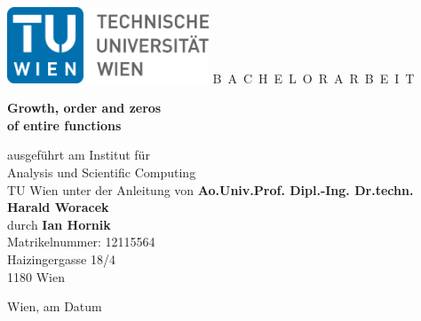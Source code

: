 \documentclass[a4paper,11pt,bibliography=totoc,listof=totoc,headinclude=true,cleardoublepage=empty,oneside]{scrbook}
\newcommand{\1}{\mathbbm{1}}
\theoremstyle{plain}
\theoremstyle{definition}
\begin{document}


\begin{titlepage}
  \begin{center}
    \includegraphics[width=0.45\textwidth]{TULogo.eps}
    \vskip 1cm%
    {\LARGE B~\Large A~C~H~E~L~O~R~A~R~B~E~I~T}
    \vskip 8mm
    {\huge\bfseries{} Growth, order and zeros \\ of entire functions \par}
    \vskip 1cm
    \large 
    ausgef\"uhrt am    
    \vskip 0.75cm
    {\Large Institut f\"ur\\[1ex] Analysis und Scientific Computing}\\[1ex]
    {\Large TU Wien}
    \vskip0.75cm
    unter der Anleitung von
    \vskip0.75cm
    {\Large\bfseries Ao.Univ.Prof. Dipl.-Ing. Dr.techn. Harald Woracek}\\[1ex]
    \vskip 0.5cm
    durch
    \vskip 0.5cm
    {\Large\bfseries Ian Hornik}\\[1ex]
    {Matrikelnummer: 12115564}\\[1ex]
    {Haizingergasse 18/4}\\[1ex]
    {1180 Wien}
  \end{center}
  
  \vfill
  
  \small
  Wien, am {\color{change} Datum} %
  \vspace*{-15mm}
\end{titlepage}

\cleardoublepage


\tableofcontents

\cleardoublepage
{}





\end{document}
